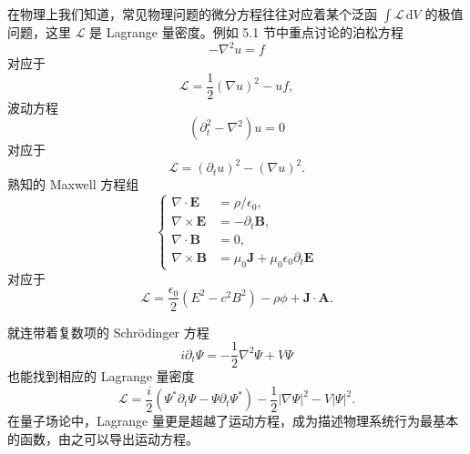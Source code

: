 在物理上我们知道，常见物理问题的微分方程往往对应着某个泛函 $\int\mathcal L\,\mathrm dV$ 的极值问题，这里 $\mathcal L$ 是 Lagrange 量密度。例如 5.1 节中重点讨论的泊松方程
\begin{equation}
-\nabla^2u=f
\tag{5.4.1}
\end{equation}
对应于
\begin{equation}
\mathcal L=\frac12(\nabla u)^2-uf,
\tag{5.4.2}
\end{equation}
波动方程
\begin{equation}
(\partial_t^2-\nabla^2)u=0
\tag{5.4.3}
\end{equation}
对应于
\begin{equation}
\mathcal L=(\partial_tu)^2-(\nabla u)^2.
\tag{5.4.4}
\end{equation}
熟知的 Maxwell 方程组
\begin{equation}
\left\{
\begin{aligned}
\nabla\cdot\bm E&=\rho/\epsilon_0,\\
\nabla\times\bm E&=-\partial_t\bm B,\\
\nabla\cdot\bm B&=0,\\
\nabla\times\bm B&=\mu_0\bm J+\mu_0\epsilon_0\partial_t\bm E
\end{aligned}\right.
\tag{5.4.5}
\end{equation}
对应于
\begin{equation}
\mathcal L=\frac{\epsilon_0}{2}(E^2-c^2B^2)-\rho\phi+\bm J\cdot\bm A.
\tag{5.4.6}
\end{equation}


就连带着复数项的 Schrödinger 方程
\begin{equation}
i\partial_t\Psi=-\frac12\nabla^2\Psi+V\Psi
\tag{5.4.7}
\end{equation}
也能找到相应的 Lagrange 量密度
\begin{equation}
\mathcal L=\frac{i}{2}\left(\Psi^*\partial_t\Psi-\Psi\partial_t\Psi^*\right)-\frac12|\nabla\Psi|^2-V|\Psi|^2.
\tag{5.4.8}
\end{equation}
在量子场论中，Lagrange 量更是超越了运动方程，成为描述物理系统行为最基本的函数，由之可以导出运动方程。

